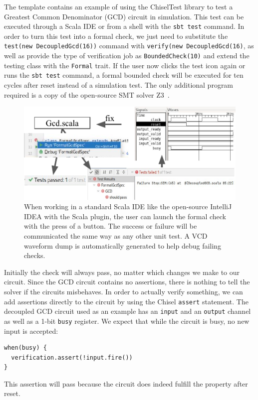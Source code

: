 \documentclass[conference]{IEEEtran}
\newcommand{\code}[1]{{\small{\texttt{#1}}}}
\begin{document}
The template contains an example of using the ChiselTest library to test a Greatest Common Denominator (GCD) circuit in simulation.
This test can be executed through a Scala IDE or from a shell with the \code{sbt test} command.
In order to turn this test into a formal check, we just need to substitute the \code{test(new DecoupledGcd(16))}
command with \code{verify(new DecoupledGcd(16)}, as well as provide the type of verification job as
\code{BoundedCheck(10)} and extend the testing class with the \code{Formal} trait.
If the user now clicks the test icon again or runs the \code{sbt test} command, a formal bounded check will
be executed for ten cycles after reset instead of a simulation test.
The only additional program required is a copy of the open-source SMT solver Z3~\cite{de2008z3}.

\begin{figure}[h]
\centering
\includegraphics{woset_formal_ide_flow.pdf}
\caption{When working in a standard Scala IDE like the open-source IntelliJ IDEA with the Scala plugin, the user can launch the formal check with the press of a button.
The success or failure will be communicated the same way as any other unit test. A VCD waveform dump is automatically generated to help debug failing checks.}
\label{fig:ide-flow}
\end{figure}

Initially the check will always pass, no matter which changes we make to our circuit.
Since the GCD circuit contains no assertions, there is nothing to tell the solver if the circuits misbehaves.
In order to actually verify something, we can add assertions directly to the circuit by using the
Chisel \code{assert} statement.
The decoupled GCD circuit used as an example has an \code{input} and an \code{output} channel
as well as a 1-bit \code{busy} register.
We expect that while the circuit is busy, no new input is accepted:
\begin{verbatim}
when(busy) {
  verification.assert(!input.fire())
}
\end{verbatim}
This assertion will pass because the circuit does indeed fulfill the property after reset.
\end{document}
